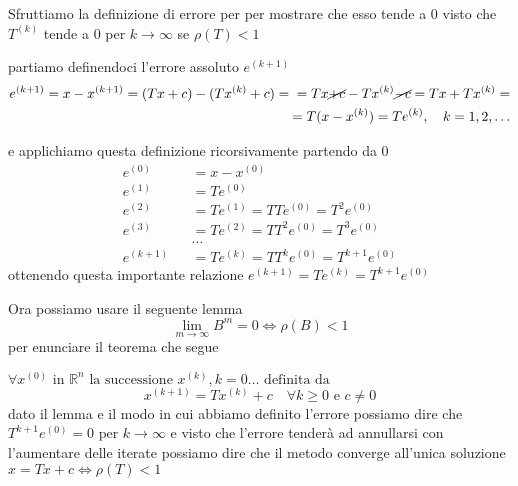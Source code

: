 \documentclass[
]{article}
\author{}
\date{}
\begin{document}
Sfruttiamo la definizione di errore per per mostrare che esso tende a
\(0\) visto che \(T^{(k)}\) tende a \(0\) per \(k\to \infty\) se
\(\rho(T)<1\)

partiamo definendoci l'errore assoluto \(e^{(k+1)}\) \[
\begin{align}e^{(k+1)}=x-x^{(k+1)}=(Tx+c)-(Tx^{(k)}+c)=\newline=Tx{\cancel{+c}}-Tx^{(k)}{\cancel{{-c}}}=Tx+Tx^{(k)}=  &  \\= T(x-x^{(k)})=Te^{(k)},\quad k=1,2,\ldots\end{align}
\]

e applichiamo questa definizione ricorsivamente partendo da \(0\) \[
\begin{aligned}
&e^{(0)}&& =x-x^{(0)}  \\
&e^{(1)}&& =Te^{(0)}  \\
&e^{(2)}&& =Te^{(1)}=TTe^{(0)}=T^{2}e^{(0)}  \\
&e^{(3)}&& =Te^{(2)}=TT^2e^{(0)}=T^3e^{(0)}  \\
&&&...&   \\
&e^{(k+1)}&& =Te^{(k)}=TT^{k}e^{(0)}=T^{k+1}e^{(0)} 
\end{aligned}
\] ottenendo questa importante relazione
\(e^{(k+1)} = Te^{(k)} = T^{k+1}e^{(0)}\)

Ora possiamo usare il seguente {lemma} \[ 
 \boxed{ \lim_{m\to\infty}B^m=0\Leftrightarrow\rho(B)<1 }
\] per enunciare il teorema che segue

\begin{theorem}
$\forall x^{(0)} \text{ in } \mathbb{R}^{n} \text{ la successione } x^{(k)}, k=0\dots \text{ definita da}$ 
$$x^{(k+1)}=Tx^{(k)}+c\quad\forall k\geq0\text{ e }c\neq0$$
dato il lemma e il modo in cui abbiamo definito l'errore possiamo dire che $T^{k+1}e^{(0)}=0 \text{ per } k \to \infty$
e visto che l'errore tenderà ad annullarsi con l'aumentare delle iterate possiamo dire che il metodo converge all'unica soluzione  $x=Tx+c \iff \rho(T) <1$ 
\end{theorem}
\end{document}
